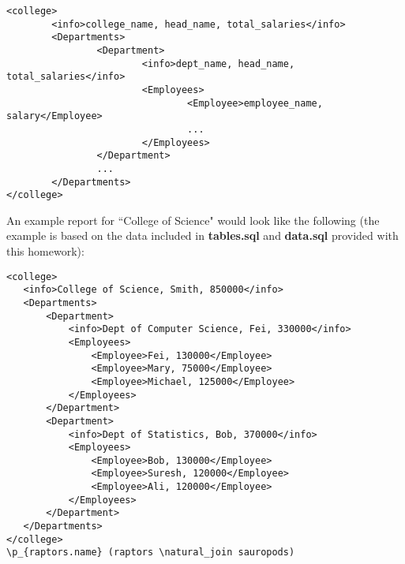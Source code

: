 \begin{questions}
\begin{verbatim}
<college>
        <info>college_name, head_name, total_salaries</info>
        <Departments>
                <Department>
                        <info>dept_name, head_name, total_salaries</info>
                        <Employees>
                                <Employee>employee_name, salary</Employee>
                                ...
                        </Employees>
                </Department>
                ...
        </Departments>
</college>
\end{verbatim}

An example report for ``College of Science" would look like the following (the example is based on the data included in \textbf{tables.sql} and \textbf{data.sql} provided with this homework):

\begin{verbatim}
<college>
   <info>College of Science, Smith, 850000</info>
   <Departments>
       <Department>
           <info>Dept of Computer Science, Fei, 330000</info>
           <Employees>
               <Employee>Fei, 130000</Employee>
               <Employee>Mary, 75000</Employee>
               <Employee>Michael, 125000</Employee>
           </Employees>
       </Department>
       <Department>
           <info>Dept of Statistics, Bob, 370000</info>
           <Employees>
               <Employee>Bob, 130000</Employee>
               <Employee>Suresh, 120000</Employee>
               <Employee>Ali, 120000</Employee>
           </Employees>
       </Department>
   </Departments>
</college>
\p_{raptors.name} (raptors \natural_join sauropods)
\end{verbatim}

\end{questions}
\bigskip 
\noindent




